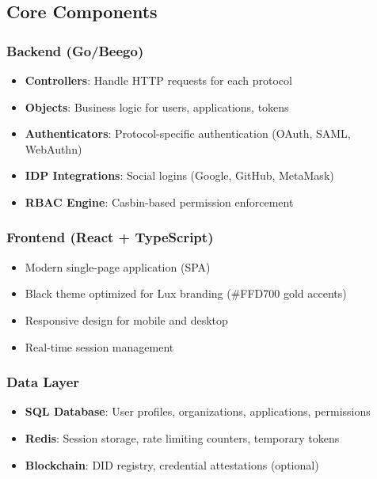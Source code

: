 \subsection{Core Components}

\subsubsection{Backend (Go/Beego)}

\begin{itemize}
  \item \textbf{Controllers}: Handle HTTP requests for each protocol
  \item \textbf{Objects}: Business logic for users, applications, tokens
  \item \textbf{Authenticators}: Protocol-specific authentication (OAuth, SAML, WebAuthn)
  \item \textbf{IDP Integrations}: Social logins (Google, GitHub, MetaMask)
  \item \textbf{RBAC Engine}: Casbin-based permission enforcement
\end{itemize}

\subsubsection{Frontend (React + TypeScript)}

\begin{itemize}
  \item Modern single-page application (SPA)
  \item Black theme optimized for Lux branding (\#FFD700 gold accents)
  \item Responsive design for mobile and desktop
  \item Real-time session management
\end{itemize}

\subsubsection{Data Layer}

\begin{itemize}
  \item \textbf{SQL Database}: User profiles, organizations, applications, permissions
  \item \textbf{Redis}: Session storage, rate limiting counters, temporary tokens
  \item \textbf{Blockchain}: DID registry, credential attestations (optional)
\end{itemize}

